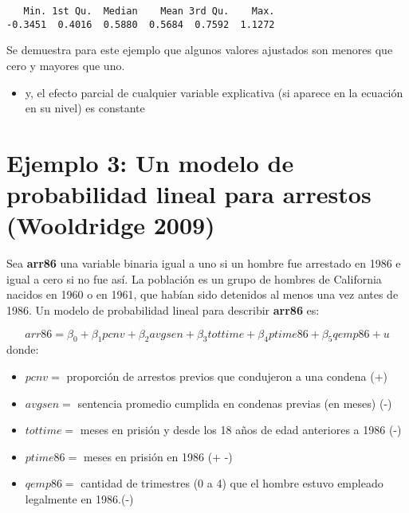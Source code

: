 \documentclass[
  letterpaper,
  DIV=11,
  numbers=noendperiod]{scrreprt}
\newenvironment{Shaded}{\begin{snugshade}}{\end{snugshade}}
\newcommand{\FunctionTok}[1]{\textcolor[rgb]{0.28,0.35,0.67}{#1}}
\newcommand{\NormalTok}[1]{\textcolor[rgb]{0.00,0.23,0.31}{#1}}
\newcommand{\SpecialCharTok}[1]{\textcolor[rgb]{0.37,0.37,0.37}{#1}}
\providecommand{\tightlist}{%
  \setlength{\itemsep}{0pt}\setlength{\parskip}{0pt}}\usepackage{longtable,booktabs,array}
\begin{document}
\begin{Shaded}
\end{Shaded}

\begin{verbatim}
   Min. 1st Qu.  Median    Mean 3rd Qu.    Max. 
-0.3451  0.4016  0.5880  0.5684  0.7592  1.1272 
\end{verbatim}

Se demuestra para este ejemplo que algunos valores ajustados son menores
que cero y mayores que uno.

\begin{itemize}
\tightlist
\item
  y, el efecto parcial de cualquier variable explicativa (si aparece en
  la ecuación en su nivel) es constante
\end{itemize}

\section{Ejemplo 3: Un modelo de probabilidad lineal para arrestos
(Wooldridge
2009)}\label{ejemplo-3-un-modelo-de-probabilidad-lineal-para-arrestos-wooldridge2009}

Sea \textbf{arr86} una variable binaria igual a uno si un hombre fue
arrestado en 1986 e igual a cero si no fue así. La población es un grupo
de hombres de California nacidos en 1960 o en 1961, que habían sido
detenidos al menos una vez antes de 1986. Un modelo de probabilidad
lineal para describir \textbf{arr86} es:

\[arr86=\beta_0+\beta_1pcnv+\beta_2avgsen+\beta_3tottime+\beta_4ptime86+\beta_5qemp86+u\]
donde:

\begin{itemize}
\item
  \(pcnv=\) proporción de arrestos previos que condujeron a una condena
  (+)
\item
  \(avgsen=\) sentencia promedio cumplida en condenas previas (en meses)
  (-)
\item
  \(tottime=\) meses en prisión y desde los 18 años de edad anteriores a
  1986 (-)
\item
  \(ptime86=\) meses en prisión en 1986 (+ -)
\item
  \(qemp86=\) cantidad de trimestres (0 a 4) que el hombre estuvo
  empleado legalmente en 1986.(-)
\end{itemize}
\end{document}
